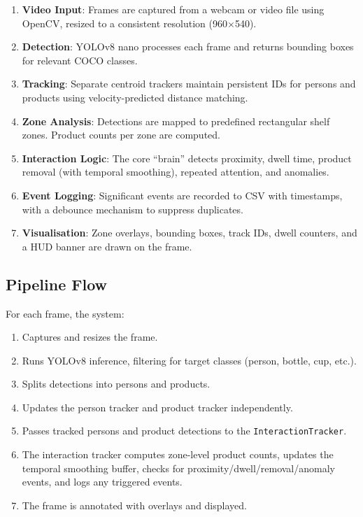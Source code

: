 \documentclass[12pt,a4paper]{article}
\begin{document}
\begin{enumerate}[nosep]
    \item \textbf{Video Input}: Frames are captured from a webcam or video file using OpenCV, resized to a consistent resolution (960$\times$540).
    \item \textbf{Detection}: YOLOv8 nano processes each frame and returns bounding boxes for relevant COCO classes.
    \item \textbf{Tracking}: Separate centroid trackers maintain persistent IDs for persons and products using velocity-predicted distance matching.
    \item \textbf{Zone Analysis}: Detections are mapped to predefined rectangular shelf zones. Product counts per zone are computed.
    \item \textbf{Interaction Logic}: The core ``brain'' detects proximity, dwell time, product removal (with temporal smoothing), repeated attention, and anomalies.
    \item \textbf{Event Logging}: Significant events are recorded to CSV with timestamps, with a debounce mechanism to suppress duplicates.
    \item \textbf{Visualisation}: Zone overlays, bounding boxes, track IDs, dwell counters, and a HUD banner are drawn on the frame.
\end{enumerate}

\subsection{Pipeline Flow}

For each frame, the system:
\begin{enumerate}[nosep]
    \item Captures and resizes the frame.
    \item Runs YOLOv8 inference, filtering for target classes (person, bottle, cup, etc.).
    \item Splits detections into persons and products.
    \item Updates the person tracker and product tracker independently.
    \item Passes tracked persons and product detections to the \texttt{InteractionTracker}.
    \item The interaction tracker computes zone-level product counts, updates the temporal smoothing buffer, checks for proximity/dwell/removal/anomaly events, and logs any triggered events.
    \item The frame is annotated with overlays and displayed.
\end{enumerate}
\end{document}
